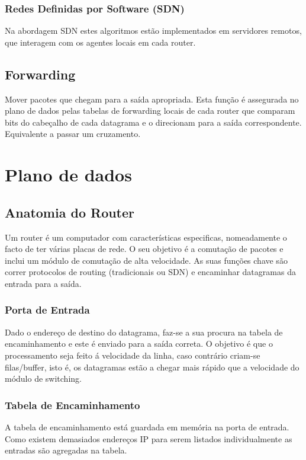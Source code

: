 \documentclass[10pt,a4paper]{report}
\begin{document}
\subsubsection{Redes Definidas por Software (SDN)}
Na abordagem SDN estes algoritmos estão implementados em servidores remotos, que interagem com os agentes locais em cada router.
\subsection{Forwarding}
Mover pacotes que chegam para a saída apropriada. Esta função é assegurada no plano de dados pelas tabelas de forwarding locais de cada router que comparam bits do cabeçalho de cada datagrama e o direcionam para a saída correspondente. Equivalente a passar um cruzamento.
\section{Plano de dados}
\subsection{Anatomia do Router}
Um router é um computador com características especificas, nomeadamente o facto de ter várias placas de rede. O seu objetivo é a comutação de pacotes e inclui um módulo de comutação de alta velocidade. As suas funções chave são correr protocolos de routing (tradicionais ou SDN) e encaminhar datagramas da entrada para a saída.
\subsubsection{Porta de Entrada}
Dado o endereço de destino do datagrama, faz-se a sua procura na tabela de encaminhamento e este é enviado para a saída correta. O objetivo é que o processamento seja feito á velocidade da linha, caso contrário criam-se filas/buffer, isto é, os datagramas estão a chegar mais rápido que a velocidade do módulo de switching.
\subsubsection{Tabela de Encaminhamento}
A tabela de encaminhamento está guardada em memória na porta de entrada. Como existem demasiados endereços IP para serem listados individualmente as entradas são agregadas na tabela.
\end{document}
